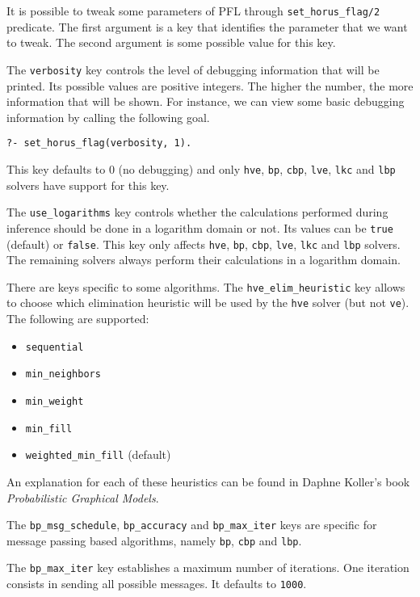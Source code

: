 \documentclass{article}
\begin{document}
It is possible to tweak some parameters of PFL through \texttt{set\_horus\_flag/2} predicate. The first argument is a key that identifies the parameter that we want to tweak. The second argument is some possible value for this key.

The \texttt{verbosity} key controls the level of debugging information that will be printed. Its possible values are positive integers. The higher the number, the more information that will be shown. For instance, we can view some basic debugging information by calling the following goal.

\texttt{?- set\_horus\_flag(verbosity, 1).}

This key defaults to 0 (no debugging) and only \texttt{hve}, \texttt{bp}, \texttt{cbp}, \texttt{lve}, \texttt{lkc} and \texttt{lbp} solvers have support for this key.

The \texttt{use\_logarithms} key controls whether the calculations performed during inference should be done in a logarithm domain or not. Its values can be \texttt{true} (default) or \texttt{false}. This key only affects \texttt{hve}, \texttt{bp}, \texttt{cbp}, \texttt{lve}, \texttt{lkc} and \texttt{lbp} solvers. The remaining solvers always perform their calculations in a logarithm domain.

There are keys specific to some algorithms. The \texttt{hve\_elim\_heuristic} key allows to choose which elimination heuristic will be used by the \texttt{hve} solver (but not \texttt{ve}). The following are supported:
\begin{itemize}
 \item \texttt{sequential}
 \item \texttt{min\_neighbors}
 \item \texttt{min\_weight}
 \item \texttt{min\_fill}
 \item \texttt{weighted\_min\_fill} (default)
\end{itemize}

An explanation for each of these heuristics can be found in Daphne Koller's book \textit{Probabilistic Graphical Models}.

The \texttt{bp\_msg\_schedule}, \texttt{bp\_accuracy} and \texttt{bp\_max\_iter} keys are specific for message passing based algorithms, namely \texttt{bp}, \texttt{cbp} and \texttt{lbp}.

The \texttt{bp\_max\_iter} key establishes a maximum number of iterations. One iteration consists in sending all possible messages. It defaults to \texttt{1000}.
\end{document}
